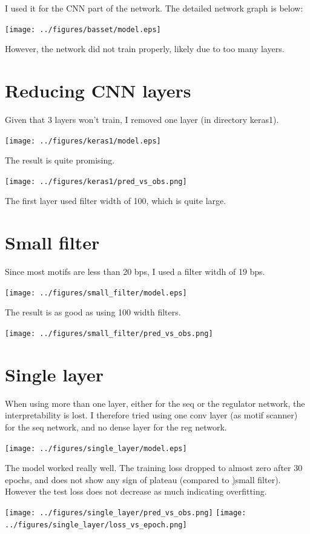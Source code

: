 \documentclass{article}
\begin{document}
I used it for the CNN part of the network. The detailed network graph is below: 

\texttt{[image: ../figures/basset/model.eps]}

However, the network did not train properly, likely due to too many layers.


\section{Reducing CNN layers}
Given that 3 layers won't train, I removed one layer (in directory keras1). 

\texttt{[image: ../figures/keras1/model.eps]}

The result is quite promising. 

\texttt{[image: ../figures/keras1/pred\_vs\_obs.png]}

The first layer used filter width of 100, which is quite large.


\section{Small filter}
\label{sec:small_filter}
Since most motifs are less than 20 bps, I used a filter witdh of 19 bps. 

\texttt{[image: ../figures/small\_filter/model.eps]}

The result is as good as using 100 width filters.

\texttt{[image: ../figures/small\_filter/pred\_vs\_obs.png]}


\section{Single layer}
When using more than one layer, either for the seq or the regulator network, the interpretability is lost. I therefore tried using one conv layer (as motif scanner) for the seq network, and no dense layer for the reg network.

\texttt{[image: ../figures/single\_layer/model.eps]}

The model worked really well. The training loss dropped to almost zero after 30 epochs, and does not show any sign of plateau (compared to \hyperref[sec:small_filter]){small filter}). However the test loss does not decrease as much indicating overfitting. 


\texttt{[image: ../figures/single\_layer/pred\_vs\_obs.png]}
\texttt{[image: ../figures/single\_layer/loss\_vs\_epoch.png]}
\end{document}

